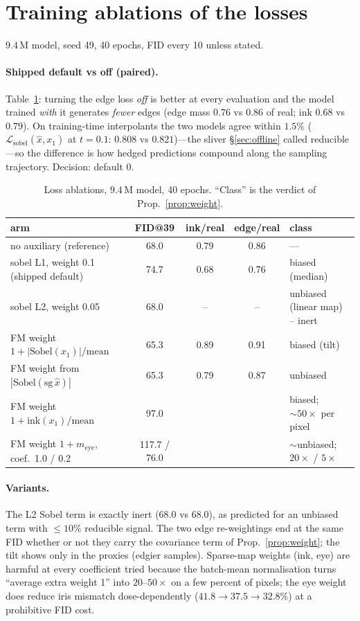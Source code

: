 \documentclass[11pt]{article}
\newcommand{\xh}{\hat{x}}
\begin{document}
\section{Training ablations of the losses}\label{sec:ablations}

$9.4$\,M model, seed 49, 40 epochs, FID every 10 unless stated.

\paragraph{Shipped default vs off (paired).} Table~\ref{tab:edge}: turning the edge loss
\emph{off} is better at every evaluation and the model trained \emph{with} it generates
\emph{fewer} edges (edge mass $0.76$ vs $0.86$ of real; ink $0.68$ vs $0.79$). On
training-time interpolants the two models agree within $1.5\%$
($\mathcal L_{\text{sobel}}(\xh,x_1)$ at $t=0.1$: $0.808$ vs $0.821$)---the sliver
\S\ref{sec:offline} called reducible---so the difference is how hedged predictions
compound along the sampling trajectory. Decision: default $0$.

\begin{table}[t]
\centering\small
\caption{Loss ablations, $9.4$\,M model, 40 epochs. ``Class'' is the verdict of
Prop.~\ref{prop:weight}.}
\label{tab:edge}
\begin{tabular}{lcccl}
\toprule
arm & FID@39 & ink/real & edge/real & class \\
\midrule
no auxiliary (reference) & 68.0 & 0.79 & 0.86 & --- \\
sobel L1, weight 0.1 (shipped default) & 74.7 & 0.68 & 0.76 & biased (median) \\
sobel L2, weight 0.05 & 68.0 & -- & -- & unbiased (linear map) -- inert \\
FM weight $1+|\text{Sobel}(x_1)|/\text{mean}$ & 65.3 & 0.89 & 0.91 & biased (tilt) \\
FM weight from $|\text{Sobel}(\text{sg}\,\xh)|$ & 65.3 & 0.79 & 0.87 & unbiased \\
FM weight $1+\text{ink}(x_1)/\text{mean}$ & 97.0 & & & biased; $\sim50\times$ per pixel \\
FM weight $1+m_{\text{eye}}$, coef.\ 1.0 / 0.2 & 117.7 / 76.0 & & & $\sim$unbiased; $20\times$ / $5\times$ \\
\bottomrule
\end{tabular}
\end{table}

\paragraph{Variants.} The L2 Sobel term is exactly inert (68.0 vs 68.0), as predicted
for an unbiased term with $\le10\%$ reducible signal. The two edge re-weightings end at
the same FID whether or not they carry the covariance term of Prop.~\ref{prop:weight};
the tilt shows only in the proxies (edgier samples). Sparse-map weights (ink, eye) are
harmful at every coefficient tried because the batch-mean normalisation turns
``average extra weight 1'' into $20$--$50\times$ on a few percent of pixels; the eye
weight does reduce iris mismatch dose-dependently ($41.8\to37.5\to32.8\%$) at a
prohibitive FID cost.
\end{document}
